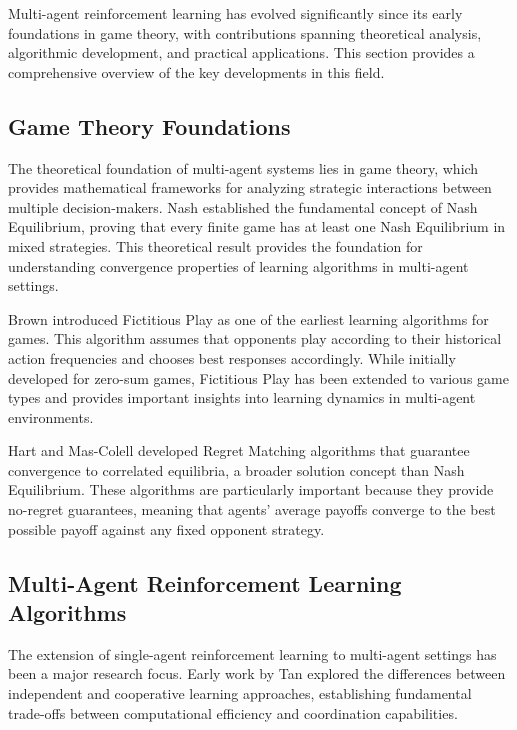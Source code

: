 \documentclass[conference]{IEEEtran}
\begin{document}
Multi-agent reinforcement learning has evolved significantly since its early foundations in game theory, with contributions spanning theoretical analysis, algorithmic development, and practical applications. This section provides a comprehensive overview of the key developments in this field.

\subsection{Game Theory Foundations}

The theoretical foundation of multi-agent systems lies in game theory, which provides mathematical frameworks for analyzing strategic interactions between multiple decision-makers. Nash \cite{nash1950equilibrium} established the fundamental concept of Nash Equilibrium, proving that every finite game has at least one Nash Equilibrium in mixed strategies. This theoretical result provides the foundation for understanding convergence properties of learning algorithms in multi-agent settings.

Brown \cite{brown1951iterative} introduced Fictitious Play as one of the earliest learning algorithms for games. This algorithm assumes that opponents play according to their historical action frequencies and chooses best responses accordingly. While initially developed for zero-sum games, Fictitious Play has been extended to various game types and provides important insights into learning dynamics in multi-agent environments.

Hart and Mas-Colell \cite{hart2000simple} developed Regret Matching algorithms that guarantee convergence to correlated equilibria, a broader solution concept than Nash Equilibrium. These algorithms are particularly important because they provide no-regret guarantees, meaning that agents' average payoffs converge to the best possible payoff against any fixed opponent strategy.

\subsection{Multi-Agent Reinforcement Learning Algorithms}

The extension of single-agent reinforcement learning to multi-agent settings has been a major research focus. Early work by Tan \cite{tan1993multi} explored the differences between independent and cooperative learning approaches, establishing fundamental trade-offs between computational efficiency and coordination capabilities.
\end{document}

